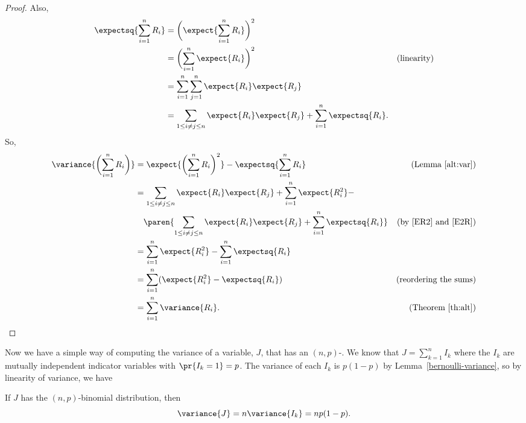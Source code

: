 \begin{editingnotes}
\begin{proof}
Also,
\begin{align}
\expectsq{\sum_{i=1}^n R_i} & = \biggl(\expect{\sum_{i=1}^n R_i}\biggr)^2 \notag\\
  &  = \biggl(\sum_{i=1}^n \expect{R_i}\biggr)^2 &\text{(linearity)} \notag\\
  &  = \sum_{i=1}^n \sum_{j=1}^n \expect{R_i} \expect{R_j}\notag\\
  & = \sum_{1\le i \neq j \le n} \expect{R_i}\expect{R_j} + \sum_{i=1}^n
     \expectsq{R_i}.\label{E2R}
\end{align}
So,
\begin{align*}
\variance{\biggl(\sum_{i=1}^n R_i\biggr)}
   & =  \expect{\biggl(\sum_{i=1}^n R_i\biggr)^2} -
\expectsq{\sum_{i=1}^n R_i}  & \text{(Lemma~\ref{alt:var})}\\
   &  = \sum_{1\le i \neq j \le n} \expect{R_i} \expect{R_j}
        + \sum_{i=1}^n \expect{R_i^2} - \\
   & \quad \paren{\sum_{1\le i \neq j \le n} \expect{R_i}\expect{R_j}
        + \sum_{i=1}^n \expectsq{R_i}}
      & \text{(by~\eqref{ER2} and~\eqref{E2R})}\\
   & = \sum_{i=1}^n \expect{R_i^2} - \sum_{i=1}^n \expectsq{R_i}\\
   & = \sum_{i=1}^n (\expect{R_i^2} - \expectsq{R_i})
             & \text{(reordering the sums)}\\
   & = \sum_{i=1}^n \variance{R_i}. & \text{(Theorem~\ref{th:alt})}
\end{align*}
\fi
\end{proof}
\end{editingnotes}


Now we have a simple way of computing the variance of a variable, $J$,
that has an $(n,p)$-.  We know that $J =
\sum_{k=1}^n I_k$ where the $I_k$ are mutually independent indicator
variables with $\pr{I_k=1}=p$.  The variance of each $I_k$ is $p(1-p)$
by Lemma~\ref{bernoulli-variance}, so by linearity of variance, we have
\begin{lemma*}
If $J$ has the $(n,p)$-binomial distribution, then
\begin{equation}\label{p1p}
\variance{J} = n \variance{I_k} = np(1-p).
\end{equation}
\end{lemma*}

\begin{problems}
\practiceproblems
{}

\classproblems
{}

\homeworkproblems
{}
\end{problems}

